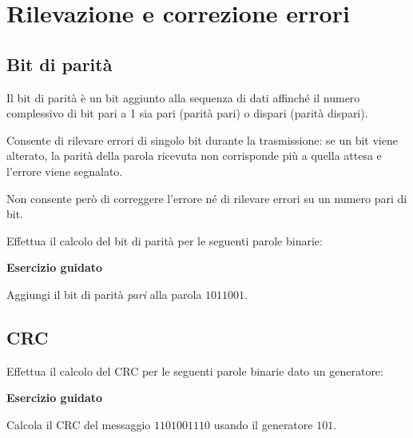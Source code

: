 \documentclass[11pt,fleqn]{book}
\begin{document}
\newpage



\chapter{Rilevazione e correzione errori}

\section{Bit di parità}
Il bit di parità è un bit aggiunto alla sequenza di dati affinché il numero complessivo di bit pari a 1 sia pari (parità pari) o dispari (parità dispari). 

\noindent
Consente di rilevare errori di singolo bit durante la trasmissione: se un bit viene alterato, la parità della parola ricevuta non corrisponde più a quella attesa e l'errore viene segnalato. 

\noindent
Non consente però di correggere l'errore né di rilevare errori su un numero pari di bit.

\vspace{0.5cm}

\noindent
Effettua il calcolo del bit di parità per le seguenti parole binarie:

\begin{esercizio}[1]
    \textbf{Esercizio guidato}

    Aggiungi il bit di parità \emph{pari} alla parola $1011001$.

    \immediate{}
    
\end{esercizio}

\newpage


\newpage

\section{CRC}
Effettua il calcolo del CRC per le seguenti parole binarie dato un generatore:


\begin{esercizio}[1]
    \textbf{Esercizio guidato}

    Calcola il CRC del messaggio $1101001110$ usando il generatore $101$.

    \immediate{}
    

\end{esercizio}
\end{document}
